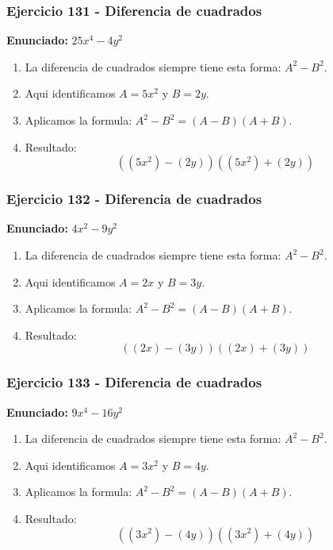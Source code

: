 \documentclass[11pt,a4paper]{article}
\begin{document}
\vspace{0.2cm}
\subsubsection*{Ejercicio 131 - Diferencia de cuadrados}
\textbf{Enunciado:} $ 25 x^{4} - 4 y^{2} $\par
\begin{enumerate}[leftmargin=2em]
\item La diferencia de cuadrados siempre tiene esta forma: \(A^2-B^2\).
\item Aqui identificamos \(A=5 x^{2}\) y \(B=2 y\).
\item Aplicamos la formula: \(A^2-B^2=(A-B)(A+B)\).
\item Resultado: \[\boxed{\left(\left(5 x^{2}\right)-\left(2 y\right)\right)\left(\left(5 x^{2}\right)+\left(2 y\right)\right)}\]
\end{enumerate}

\vspace{0.2cm}
\subsubsection*{Ejercicio 132 - Diferencia de cuadrados}
\textbf{Enunciado:} $ 4 x^{2} - 9 y^{2} $\par
\begin{enumerate}[leftmargin=2em]
\item La diferencia de cuadrados siempre tiene esta forma: \(A^2-B^2\).
\item Aqui identificamos \(A=2 x\) y \(B=3 y\).
\item Aplicamos la formula: \(A^2-B^2=(A-B)(A+B)\).
\item Resultado: \[\boxed{\left(\left(2 x\right)-\left(3 y\right)\right)\left(\left(2 x\right)+\left(3 y\right)\right)}\]
\end{enumerate}

\vspace{0.2cm}
\subsubsection*{Ejercicio 133 - Diferencia de cuadrados}
\textbf{Enunciado:} $ 9 x^{4} - 16 y^{2} $\par
\begin{enumerate}[leftmargin=2em]
\item La diferencia de cuadrados siempre tiene esta forma: \(A^2-B^2\).
\item Aqui identificamos \(A=3 x^{2}\) y \(B=4 y\).
\item Aplicamos la formula: \(A^2-B^2=(A-B)(A+B)\).
\item Resultado: \[\boxed{\left(\left(3 x^{2}\right)-\left(4 y\right)\right)\left(\left(3 x^{2}\right)+\left(4 y\right)\right)}\]
\end{enumerate}
\end{document}
